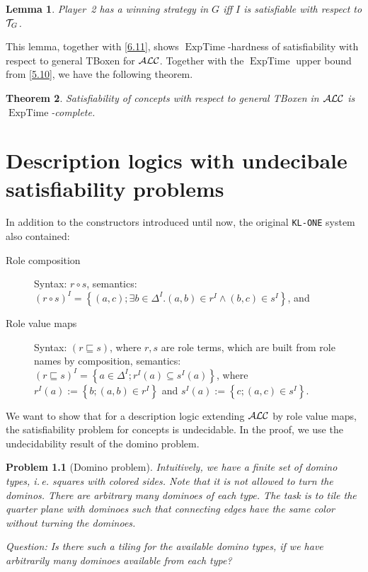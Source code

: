 \documentclass[openany]{scrbook}
\theoremstyle{break}
\newtheorem{Theorem}{Theorem}[chapter]
\newtheorem{Lemma}[Theorem]{Lemma}
\theoremstyle{nonumberbreak}
\newtheorem{Problem}{Problem}
\theoremstyle{nonumberplain}
\theoremstyle{nonumberbreak}
\newcommand{\set}[1]{\left\{#1\right\}}
\newcommand{\ie}{i{.}\,e{.}\xspace}
\newcommand{\ALC}{{\cal A}{\cal L}{\cal C}}
\newcommand{\ExpTime}{\operatorname{ExpTime}}
\begin{document}
\begin{Lemma}
  \label{6.12}
  Player~2 has a winning strategy in $G$ iff $I$ is satisfiable with
  respect to ${\cal T}_G$.
\end{Lemma}

This lemma, together with \cref{6.11}, shows $\ExpTime$-hardness of
satisfiability with respect to general TBoxen for $\ALC$. Together
with the $\ExpTime$ upper bound from \cref{5.10}, we have the following
theorem.

\begin{Theorem}
  \label{6.13}
  Satisfiability of concepts with respect to general TBoxen in $\ALC$
  is $\ExpTime$-complete.
\end{Theorem}

\chapter{Description logics with undecibale satisfiability problems}
In addition to the constructors introduced until now, the original
\texttt{KL-ONE} system also contained:
\begin{description}
\item[Role composition] Syntax: $r \circ s$, semantics: $(r \circ s)^I
  = \set{(a, c); \exists b \in \Delta^I. (a, b) \in r^I \wedge (b, c)
    \in s^I}$, and
\item[Role value maps] Syntax: $(r \sqsubseteq s)$, where $r, s$ are
  role terms, which are built from role names by composition,
  semantics: $(r \sqsubseteq s)^I = \set{a \in \Delta^I; r^I(a)
    \subseteq s^I(a)}$, where $r^I(a) := \set{b; (a, b) \in r^I}$ and
  $s^I(a) := \set{c; (a, c) \in s^I}$.
\end{description}

We want to show that for a description logic extending $\ALC$ by role
value maps, the satisfiability problem for concepts is undecidable. In
the proof, we use the undecidability result of the domino problem.

\begin{Problem}[Domino problem]
  Intuitively, we have a finite set of domino types, \ie squares with
  colored sides.
  Note that it is not allowed to turn the
  dominos. There are arbitrary many dominoes of each type. The task is
  to tile the quarter plane with dominoes such that connecting edges
  have the same color without turning the dominoes.

  Question: Is there such a tiling for the available domino types, if
  we have arbitrarily many dominoes available from each type?
\end{Problem}
\end{document}
